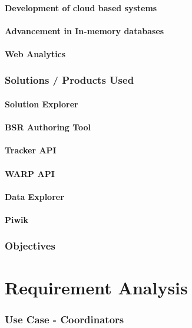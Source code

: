 \documentclass[a4paper, 12pt,oneside]{article}
\begin{document}
\subsection{Development of cloud based systems}
\subsection{Advancement in In-memory databases}
\subsection{Web Analytics}

\section{Solutions / Products Used}
\subsection{Solution Explorer}
\subsection{BSR Authoring Tool}
\subsection{Tracker API}
\subsection{WARP API}
\subsection{Data Explorer}
\subsection{Piwik}

\section{Objectives}

\part{Requirement Analysis}
\section{Use Case - Coordinators}
\end{document}
